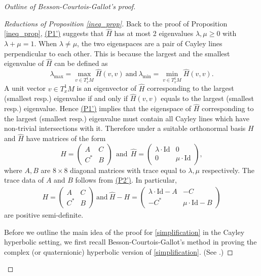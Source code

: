\documentclass{article}
\newcommand{\id}{\mathrm{Id}}
\newcommand{\matii}[2]{\left(\begin{array}{cc} #1\\#2\end{array}\right)}
\theoremstyle{definition}
\begin{document}
\begin{proof}[Outline of Besson-Courtois-Gallot's proof]
\begin{proof}[Reductions of Proposition \ref{ineq_prop}]
Back to the proof of Proposition \ref{ineq_prop}, \hyperlink{P1'}{(P1')} suggests that $\widehat{H}$ has at most 2 eigenvalues $\lambda,\mu\geq 0$ with $\lambda+\mu=1$. When $\lambda\neq\mu$, the two eigenspaces are a pair of Cayley lines perpendicular to each other. This is because the largest and the smallest eigenvalue of $\widehat{H}$ can be defined as
$$\lambda_{\max}=\max_{v\in T^1_xM}\widehat{H}(v,v)\mathrm{~and~}\lambda_{\min}=\min_{v\in T^1_xM}\widehat{H}(v,v).$$ 
A unit vector $v\in T^1_xM$ is an eigenvector  of $\widehat H$ corresponding to the largest (smallest resp.) eigenvalue if and only if $\widehat H(v,v)$ equals to the largest (smallest resp.) eigenvalue. Hence \hyperlink{P1'}{(P1')} implies that the eigenspace of $\widehat H$ corresponding to the largest (smallest resp.) eigenvalue must contain all Cayley lines which have non-trivial intersections with it.
Therefore under a suitable orthonormal basis $H$ and $\widehat{H}$ have matrices of the form
$$H=\matii{A&C}{C^*&B}\mathrm{~~and~~}\widehat{H}=\matii{\lambda\cdot\id&0}{0&\mu\cdot\id},$$
where $A, B$ are $8\times 8$ diagonal matrices with trace equal to $\lambda,\mu$ respectively. The trace data of $A$ and $B$ follows from \hyperlink{P2'}{(P2')}.  In particular, 
\begin{align}\label{matrix_formulation}H=\matii{A&C}{C^*&B}\mathrm{~and~}\widehat H-H=\matii{\lambda\cdot\id-A&-C}{-C^*&\mu\cdot\id-B}\end{align}
are positive semi-definite. 


Before we outline the main idea of the proof for \eqref{simplification} in the Cayley hyperbolic setting, we first recall Besson-Courtois-Gallot's method in proving the complex (or quaternionic) hyperbolic version of \eqref{simplification}. (See \cite[B.3 Lemme]{BCG1}.) 


\end{proof}
\end{proof}
\end{document}
